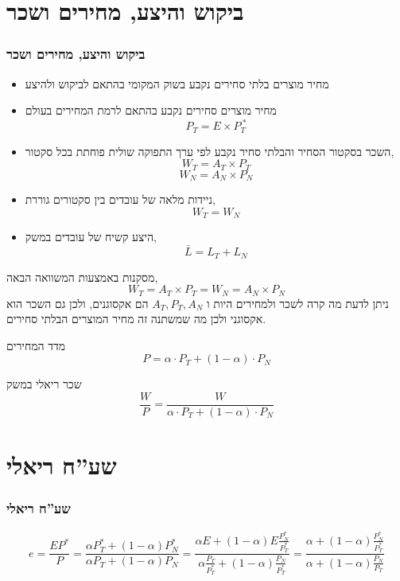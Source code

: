 \documentclass[usenames,dvipsnames]{beamer}
\begin{document}
\begin{RTL}
\section{ביקוש והיצע, מחירים ושכר}
\begin{frame}[allowframebreaks]
    \frametitle{ביקוש והיצע, מחירים ושכר}
    \begin{itemize}
        \item מחיר מוצרים בלתי סחירים נקבע בשוק המקומי בהתאם לביקוש ולהיצע
        \item מחיר מוצרים סחירים נקבע בהתאם לרמת המחירים בעולם
        $$P_T = E \times P_T^{\ *}$$
        \item השכר בסקטור הסחיר והבלתי סחיר נקבע לפי ערך התפוקה שולית פוחתת בכל סקטור,
        $$W_T = A_T \times P_T$$
        $$W_N = A_N \times P_N$$
        \item ניידות מלאה של עובדים בין סקטורים גוררת,
        $$W_T = W_N$$
        \item היצע קשיח של עובדים במשק, 
        $$\bar{L} = L_T + L_N$$
    \end{itemize}
    \framebreak
    \begin{block}{מסקנות}
        באמצעות המשוואה הבאה,
        $$
        W_T = A_T \times P_T = W_N = A_N \times P_N
        $$
        ניתן לדעת מה קרה לשכר ולמחירים היות ו $A_T, P_T, A_N$ הם אקסוגנים, ולכן גם השכר הוא אקסוגני ולכן מה שמשתנה זה מחיר המוצרים הבלתי סחירים. 
       \end{block}
       \begin{block}{מדד המחירים}
        $$P = \alpha \cdot P_T + \left(1- \alpha\right) \cdot P_N$$
       \end{block}
       \begin{block}{שכר ריאלי במשק}
        $$\frac{W}{P} = \frac{W}{\alpha \cdot P_T + \left(1- \alpha\right) \cdot P_N}$$
       \end{block}
\end{frame}

\section{שע''ח ריאלי}
\begin{frame}
    \frametitle{שע''ח ריאלי}
    $$
    e=\frac{E P^*}{P}=\frac{\alpha P_T^*+(1-\alpha) P_N^*}{\alpha P_T+(1-\alpha) P_N}=\frac{\alpha E+(1-\alpha) E \frac{P_N^*}{P_T^*}}{\alpha \frac{P_T}{P_T^*}+(1-\alpha) \frac{P_N}{P_T^*}}=\frac{\alpha+(1-\alpha) \frac{P_N^*}{P_T^*}}{\alpha+(1-\alpha) \frac{P_N}{P_T}}
    $$
    

\end{frame}
\end{RTL}
\end{document}

